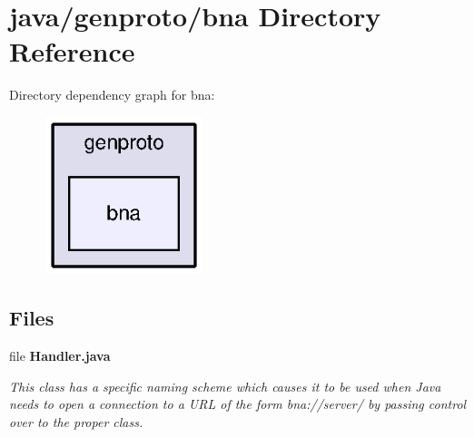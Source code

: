 \section{java/genproto/bna Directory Reference}
\label{dir_9ab14bd24c83483f76923c4d364197b5}
Directory dependency graph for bna\+:
\nopagebreak
\begin{figure}[H]
\begin{center}
\leavevmode
\includegraphics[width=130pt]{dir_9ab14bd24c83483f76923c4d364197b5_dep}
\end{center}
\end{figure}
\subsection*{Files}
\begin{DoxyCompactItemize}
\item 
file {\bf Handler.\+java}
\begin{DoxyCompactList}\small\item\em This class has a specific naming scheme which causes it to be used when Java needs to open a connection to a U\+R\+L of the form bna\+://server/ by passing control over to the proper class. \end{DoxyCompactList}\end{DoxyCompactItemize}

